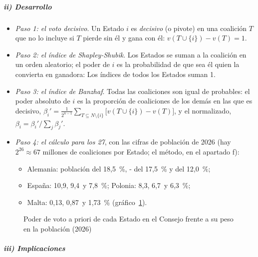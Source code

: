 \documentclass[11pt]{article}
\begin{document}
\subparagraph{ii) Desarrollo}

\begin{itemize}
\item \emph{Paso 1: el voto decisivo}. Un Estado $i$ es \emph{decisivo} (o pivote) en una coalición $T$ que no lo incluye si $T$ pierde sin él y gana con él: $v(T\cup\{i\})-v(T)=1$.
\item \emph{Paso 2: el índice de Shapley-Shubik}. Los Estados se suman a la coalición en un orden aleatorio; el poder de $i$ es la probabilidad de que sea él quien la convierta en ganadora:
  Los índices de todos los Estados suman 1.
\item \emph{Paso 3: el índice de Banzhaf}. Todas las coaliciones son igual de probables: el poder absoluto de $i$ es la proporción de coaliciones de los demás en las que es decisivo, $\beta_i'=\frac{1}{2^{n-1}}\sum_{T\subseteq N\setminus\{i\}}\big[v(T\cup\{i\})-v(T)\big]$, y el normalizado, $\beta_i=\beta_i'/\sum_j\beta_j'$.
\item \emph{Paso 4: el cálculo para los 27}, con las cifras de población de 2026 (hay $2^{26}\approx67$ millones de coaliciones por Estado; el método, en el apartado f):
  \begin{itemize}
  \item Alemania: población del 18,5~\%, - del 17,5~\% y  del 12,0~\%;
  \item España: 10,9, 9,4~y 7,8~\%; Polonia: 8,3, 6,7~y 6,3~\%;
  \item Malta: 0,13, 0,87~y 1,73~\% (gráfico~\ref{fig:poder}).
  \end{itemize}
\end{itemize}

\begin{figure}[H]
\centering
\caption{Poder de voto a priori de cada Estado en el Consejo frente a su peso en la población (2026)}\label{fig:poder}
\end{figure}

\subparagraph{iii) Implicaciones}
\end{document}
